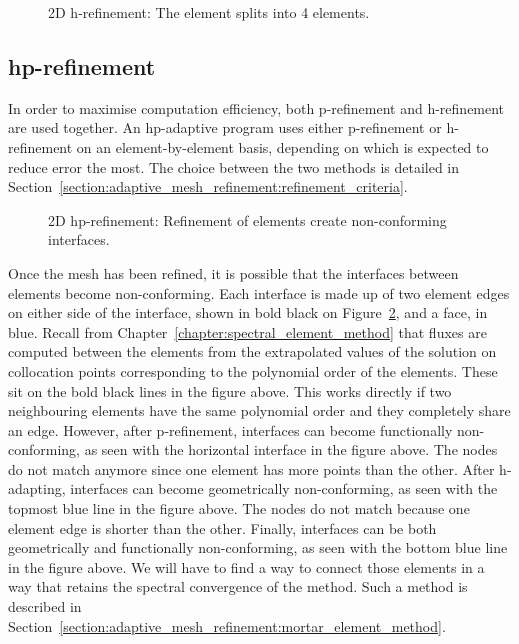 \begin{figure}[H]
	\centering
	
	\caption{2D h-refinement: The element splits into 4 elements.}\label{fig:h-refinement}
\end{figure}

\subsection{hp-refinement}\label{subsection:adaptive_mesh_refinement:refinement_strategies:hp-refinement}

In order to maximise computation efficiency, both p-refinement and h-refinement are used together.
An hp-adaptive program uses either p-refinement or h-refinement on an element-by-element basis,
depending on which is expected to reduce error the most. The choice between the two methods is
detailed in Section~\ref{section:adaptive_mesh_refinement:refinement_criteria}.

\begin{figure}[H]
	\centering
	
	\caption{2D hp-refinement: Refinement of elements create non-conforming interfaces.}\label{fig:hp-refinement}
\end{figure}

Once the mesh has been refined, it is possible that the interfaces between elements become
non-conforming. Each interface is made up of two element edges on either side of the interface,
shown in bold black on Figure~\ref{fig:hp-refinement}, and a face, in blue. Recall from
Chapter~\ref{chapter:spectral_element_method} that fluxes are computed between the elements from the
extrapolated values of the solution on collocation points corresponding to the polynomial order of
the elements. These sit on the bold black lines in the figure above. This works directly if two
neighbouring elements have the same polynomial order and they completely share an edge. However,
after p-refinement, interfaces can become functionally non-conforming, as seen with the horizontal
interface in the figure above. The nodes do not match anymore since one element has more points than
the other. After h-adapting, interfaces can become geometrically non-conforming, as seen with the
topmost blue line in the figure above. The nodes do not match because one element edge is shorter
than the other. Finally, interfaces can be both geometrically and functionally non-conforming, as
seen with the bottom blue line in the figure above. We will have to find a way to connect those
elements in a way that retains the spectral convergence of the method. Such a method is described in
Section~\ref{section:adaptive_mesh_refinement:mortar_element_method}.

